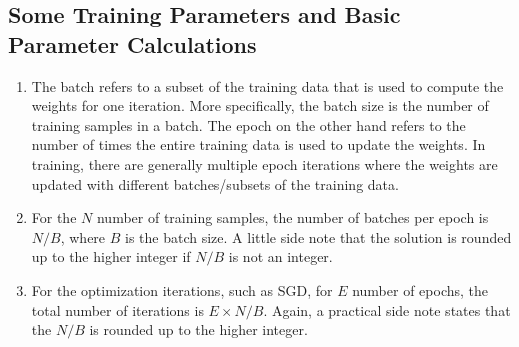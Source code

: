 \documentclass[3p,times,procedia]{elsarticle}
\begin{document}
\subsection{\textbf{Some Training Parameters and Basic Parameter Calculations}}
\begin{enumerate}
    \item The batch refers to a subset of the training data that is used to compute the weights for one iteration. More specifically, the batch size is the number of training samples in a batch.
 The epoch on the other hand refers to the number of times the entire training data is used to update the weights. In training, there are generally multiple epoch iterations where the weights are updated with different batches/subsets of the training data.
    \item For the $N$ number of training samples, the number of batches per epoch is $N/B$, where $B$ is the batch size. A little side note that the solution is rounded up to the higher integer if $N/B$ is not an integer.
    \item For the optimization iterations, such as SGD, for $E$ number of epochs, the total number of iterations is $E \times N/B$. Again, a practical side note states that the $N/B$ is rounded up to the higher integer.
\end{enumerate}
\end{document}
